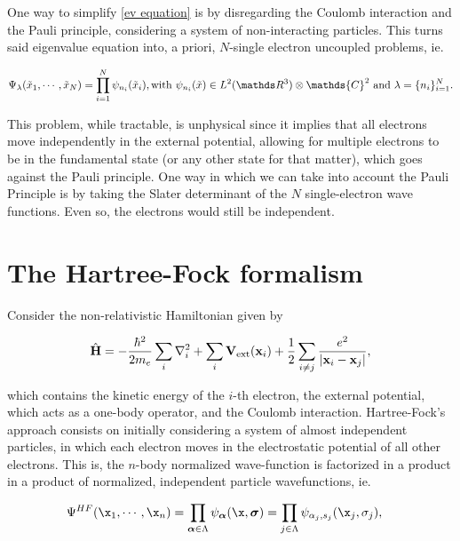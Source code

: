 \documentclass{homework}
\begin{document}
One way to simplify \eqref{ev equation} is by disregarding the Coulomb interaction and the Pauli principle, considering a system of non-interacting particles. This turns said eigenvalue equation into, a priori, $N$-single electron uncoupled problems, ie.

$$
\Psi_\lambda(\tilde{x}_1, \cdots, \tilde{x}_N) = \prod_{i=1}^{N} \psi_{n_i}(\tilde{x}_i), \textnormal{with } \psi_{n_i}(\tilde{x}) \in L^2(\R^{3}) \otimes \mathds{C}^2 \textnormal{ and } \lambda = \{n_i\}_{i=1}^{N}.
$$

This problem, while tractable, is unphysical since it implies that all electrons move independently in the external potential, allowing for multiple electrons to be in the fundamental state (or any other state for that matter), which goes against the Pauli principle. One way in which we can take into account the Pauli Principle is by taking the Slater determinant of the $N$ single-electron wave functions. Even so, the electrons would still be independent. \\

\section{The Hartree-Fock formalism}

Consider the non-relativistic Hamiltonian given by 

\begin{equation}
    \hat{\bf H} = -\frac{\hbar^2}{2m_e} \sum_i \nabla^2_i + \sum_{i} {\bf V}_{\textnormal{ext}} ({\bf x}_i) + \frac{1}{2} \sum_{i \neq j} \frac{e^2}{|{\bf x}_i-{\bf x}_j|},
\label{hamiltonian HF}
\end{equation}

which contains the kinetic energy of the $i$-th electron, the external potential, which acts as a one-body operator, and the Coulomb interaction. Hartree-Fock's approach consists on initially considering a system of almost independent particles, in which each electron moves in the electrostatic potential of all other electrons. This is, the $n$-body normalized wave-function is factorized in a product in a product of normalized, independent particle wavefunctions, ie.

\begin{align}
     & \Psi^{HF} (\x_1, \cdots, \x_n) = \prod_{\bm{\alpha} \in \Lambda} \psi_{\bm{\alpha}}(\x, {\bm \sigma}) =  \prod_{j \in \Lambda}\psi_{\alpha_j, s_j}(\x_j, \sigma_j),
     \label{Hartree's ansatz}
\end{align}
\end{document}
